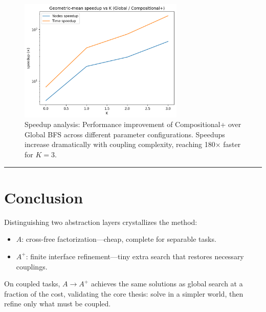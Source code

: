 \documentclass[11pt]{article}
\begin{document}
\begin{figure}[h]
\centering
\includegraphics[width=0.7\textwidth]{speedup_vs_k.png}
\caption{Speedup analysis: Performance improvement of Compositional+ over Global BFS across different parameter configurations. Speedups increase dramatically with coupling complexity, reaching 180× faster for $K=3$.}
\label{fig:speedup}
\end{figure}

\vspace{6pt}\noindent\rule{\textwidth}{0.4pt}\vspace{6pt}

\section{Conclusion}

Distinguishing two abstraction layers crystallizes the method:
\begin{itemize}
    \item $A$: cross-free factorization---cheap, complete for separable tasks.
    \item $A^{+}$: finite interface refinement---tiny extra search that restores necessary couplings.
\end{itemize}

On coupled tasks, $A\to A^{+}$ achieves the same solutions as global search at a fraction of the cost, validating the core thesis: solve in a simpler world, then refine only what must be coupled.
\end{document}

